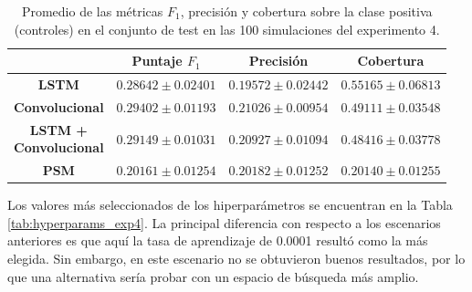 \documentclass[../../main.tex]{subfiles}
\begin{document}
\begin{table}[H]
    \centering
    \renewcommand{\arraystretch}{1.2}
    \begin{tabular}{|c|c|c|c|}
        \hline
         & \textbf{Puntaje} \(F_1\) & \textbf{Precisión} & \textbf{Cobertura} \\ \hline\hline
        \textbf{LSTM}
            & $0.28642 \pm 0.02401$ & $0.19572 \pm 0.02442$ & $\mathbf{0.55165 \pm 0.06813}$ \\ \hline
        \textbf{Convolucional}
            & $\mathbf{0.29402 \pm 0.01193}$ & $\mathbf{0.21026 \pm 0.00954}$ & $0.49111 \pm 0.03548$ \\ \hline
        \makecell{\textbf{LSTM +} \\ \textbf{Convolucional}}
            & $0.29149 \pm 0.01031$ & $0.20927 \pm 0.01094$ & $0.48416 \pm 0.03778$ \\ \hline
        \textbf{PSM}
            & $0.20161 \pm 0.01254$ & $0.20182 \pm 0.01252$ & $0.20140 \pm 0.01255$ \\
        \hline
    \end{tabular}
    \caption{Promedio de las métricas \(F_1\), precisión y cobertura sobre la
    clase positiva (controles) en el conjunto de test en las 100 simulaciones del
    experimento 4.}
    \label{tab:results_exp4}
\end{table}

Los valores más seleccionados de los hiperparámetros se encuentran en la Tabla
\ref{tab:hyperparams_exp4}. La principal diferencia con respecto a los escenarios
anteriores es que aquí la tasa de aprendizaje de 0.0001 resultó como la más elegida. Sin
embargo, en este escenario no se obtuvieron buenos resultados, por lo que una alternativa
sería probar con un espacio de búsqueda más amplio.
\end{document}
